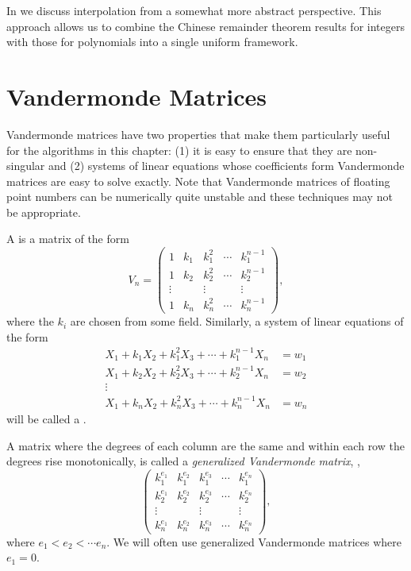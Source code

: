 In  we discuss interpolation from a
somewhat more abstract perspective.  This approach allows us to
combine the Chinese remainder theorem results for integers with those
for polynomials into a single uniform framework.

\section{Vandermonde Matrices}
\label{Vandermonde:Sec}


Vandermonde matrices have two properties that make them particularly
useful for the algorithms in this chapter: (1) it is easy to ensure
that they are non-singular and (2) systems of linear equations whose
coefficients form Vandermonde matrices are easy to solve exactly. Note
that Vandermonde matrices of floating point numbers can be numerically
quite unstable and these techniques may not be appropriate.

A  is a matrix of the form  
\begin{equation} \label{Vandermonde:Eq}
V_n = \begin{pmatrix}
1& k_1 & k_1^2 & \cdots & k_1^{n-1}\\
1& k_2 & k_2^2 & \cdots & k_2^{n-1}\\
\vdots& &\vdots& & \vdots\\
1& k_n & k_n^2 & \cdots & k_n^{n-1}\end{pmatrix},
\end{equation}
where the $k_i$ are chosen from some field.
Similarly, a system of linear equations of the form
\[
\begin{aligned}
X_1 + k_1 X_2 + k_1^2 X_3 + \cdots + k_1^{n-1} X_n &= w_1 \\
X_1 + k_2 X_2 + k_2^2 X_3 + \cdots + k_2^{n-1} X_n &= w_2 \\
\vdots&\\
X_1 + k_n X_2 + k_n^2 X_3 + \cdots + k_n^{n-1} X_n &= w_n 
\end{aligned}
\]
will be called a .

A matrix where the degrees of each column are the same and within each
row the degrees rise monotonically, is called a {\em generalized
Vandermonde matrix\/}, \viz,
\[
\begin{pmatrix}
k_1^{e_1}& k_1^{e_2} & k_1^{e_3} & \cdots & k_1^{e_n}\\
k_2^{e_1}& k_2^{e_2} & k_2^{e_3} & \cdots & k_2^{e_n}\\
\vdots& &\vdots& & \vdots\\
k_n^{e_1}& k_n^{e_2} & k_n^{e_3} & \cdots & k_n^{e_n}\end{pmatrix},
\]
where $e_1 < e_2 < \cdots e_n$.  We will often use generalized
Vandermonde matrices where $e_1 = 0$.

